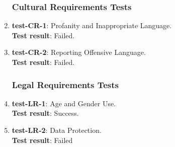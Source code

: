 \documentclass[12pt, titlepage]{article}
\begin{document}
\begin{enumerate}
\subsubsection{Cultural Requirements Tests}
	\item{\textbf{test-CR-1}}: Profanity and Inappropriate Language.\\
	\textbf{Test result}: Failed.
	
	\item{\textbf{test-CR-2}}: Reporting Offensive Language.\\
	\textbf{Test result}: Failed.
	
\subsubsection{Legal Requirements Tests}
	\item{\textbf{test-LR-1}}: Age and Gender Use.\\
	\textbf{Test result}: Success.
	
	\item{\textbf{test-LR-2}}: Data Protection.\\
	\textbf{Test result}: Failed
	
\end{enumerate}
	
%
\end{document}
